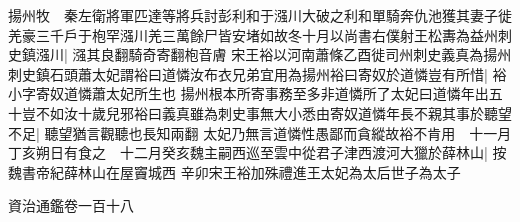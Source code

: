 揚州牧　秦左衛將軍匹達等將兵討彭利和于漒川大破之利和單騎奔仇池獲其妻子徙羌豪三千戶于枹罕漒川羌三萬餘尸皆安堵如故冬十月以尚書右僕射王松夀為益州刺史鎮漒川|{
	漒其良翻騎奇寄翻枹音膚}
宋王裕以河南蕭條乙酉徙司州刺史義真為揚州刺史鎮石頭蕭太妃謂裕曰道憐汝布衣兄弟宜用為揚州裕曰寄奴於道憐豈有所惜|{
	裕小字寄奴道憐蕭太妃所生也}
揚州根本所寄事務至多非道憐所了太妃曰道憐年出五十豈不如汝十歲兒邪裕曰義真雖為刺史事無大小悉由寄奴道憐年長不親其事於聽望不足|{
	聽望猶言觀聽也長知兩翻}
太妃乃無言道憐性愚鄙而貪縱故裕不肯用　十一月丁亥朔日有食之　十二月癸亥魏主嗣西巡至雲中從君子津西渡河大獵於薛林山|{
	按魏書帝紀薛林山在屋竇城西}
辛卯宋王裕加殊禮進王太妃為太后世子為太子

資治通鑑卷一百十八














































































































































